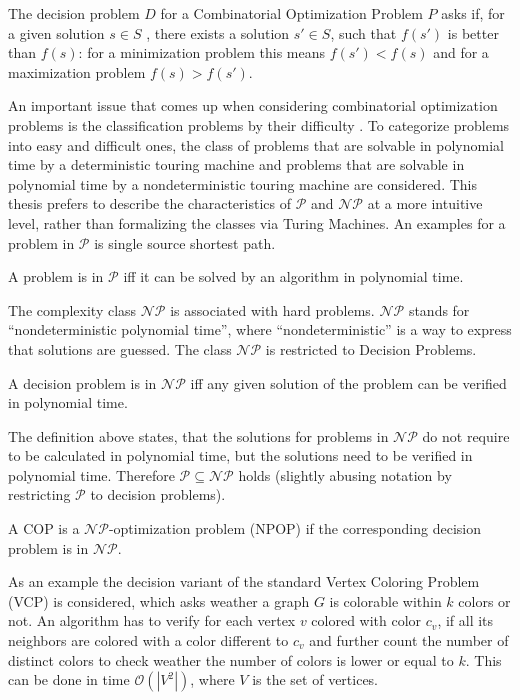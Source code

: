 \begin{definition}
The decision problem $D$ for a Combinatorial Optimization Problem $P$ asks if, for a given solution $s \in S$ , there exists a solution $s' \in S$, such that $f(s')$ is better than $f(s)$: for a minimization problem this means $f(s') < f(s)$ and for a maximization problem $f(s) > f (s')$.
\end{definition}
An important issue that comes up when considering combinatorial optimization problems is the classification problems by their difficulty . To categorize problems into easy and difficult ones, the class of problems that are solvable in polynomial time by a deterministic touring machine and problems that are solvable in polynomial time by a nondeterministic touring machine are considered. This thesis prefers to describe the characteristics of $\mathcal{P}$ and $\mathcal{NP}$ at a more intuitive level, rather than formalizing the classes via Turing Machines. An examples for a problem in $\mathcal{P}$ is single source shortest path.
\begin{definition}
A problem is in $\mathcal{P}$ iff it can be solved by an algorithm in polynomial time.
\end{definition}
The complexity class $\mathcal{NP}$ is associated with hard problems. $\mathcal{NP}$ stands for ``nondeterministic polynomial time'', where ``nondeterministic'' is a way to express that solutions are guessed. The class $\mathcal{NP}$ is restricted to Decision Problems.
\begin{definition}
A decision problem is in $\mathcal{NP}$ iff any given solution of the problem can be verified in polynomial time.
\end{definition}
The definition above states, that the solutions for problems in $\mathcal{NP}$ do not require to be calculated in polynomial time, but the solutions need to be verified in polynomial time. Therefore $\mathcal{P} \subseteq \mathcal{NP}$ holds (slightly abusing notation by restricting $\mathcal{P}$ to decision problems)\cite{neumann-10}.
\begin{definition}
A COP is a $\mathcal{NP}$-optimization problem (NPOP) if the corresponding decision problem is in $\mathcal{NP}$.
\end{definition}
As an example the decision variant of the standard Vertex Coloring Problem (VCP) is considered, which asks weather a graph $G$ is colorable within $k$ colors or not. An algorithm has to verify for each vertex $v$ colored with color $c_v$, if all its neighbors are colored with a color different to $c_v$ and further count the number of distinct colors to check weather the number of colors is lower or equal to $k$. This can be done in time  $\mathcal O(\left\vert{V^2}\right\vert)$, where $V$ is the set of vertices.\\
